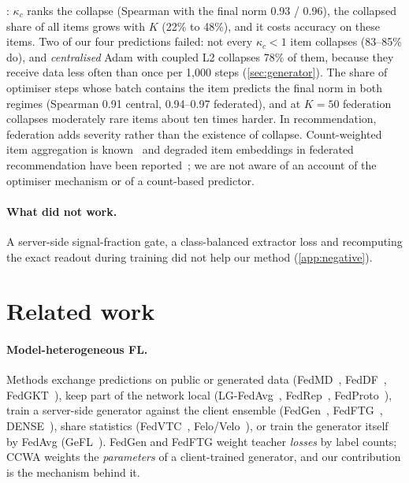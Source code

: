 \documentclass[10pt]{article}
\theoremstyle{plain}
\theoremstyle{definition}
\begin{document}
: $\kappa_c$ ranks the collapse (Spearman with the final norm 0.93 / 0.96), the collapsed share of
all items grows with $K$ (22\% to 48\%), and it costs accuracy on these items. Two of our four predictions failed: not
every $\kappa_c<1$ item collapses (83--85\% do), and \emph{centralised} Adam with coupled L2 collapses 78\% of them,
because they receive data less often than once per 1,000 steps (\cref{sec:generator}). The share of optimiser steps
whose batch contains the item predicts the final norm in both regimes (Spearman 0.91 central, 0.94--0.97 federated),
and at $K=50$ federation collapses moderately rare items about ten times harder. In recommendation, federation adds
severity rather than the existence of collapse. Count-weighted item aggregation is known~\cite{perifanis2022fedncf} and degraded item embeddings in federated
recommendation have been reported~\cite{shen2025embedding}; we are not aware of an account of the optimiser mechanism
or of a count-based predictor.

\paragraph{What did not work.} A server-side signal-fraction gate, a class-balanced extractor loss and recomputing
the exact readout during training did not help our method (\cref{app:negative}).

\section{Related work}

\paragraph{Model-heterogeneous FL.} Methods exchange predictions on public or generated data
(FedMD~\cite{li2019fedmd}, FedDF~\cite{lin2020feddf}, FedGKT~\cite{he2020fedgkt}), keep part of the network local
(LG-FedAvg~\cite{liang2019lg}, FedRep~\cite{collins2021fedrep}, FedProto~\cite{tan2022fedproto}), train a server-side
generator against the client ensemble (FedGen~\cite{zhu2021fedgen}, FedFTG~\cite{zhang2022fedftg},
DENSE~\cite{zhang2022dense}), share statistics (FedVTC~\cite{niu2026fedvtc}, Felo/Velo~\cite{chan2025}), or train the
generator itself by FedAvg (GeFL~\cite{kang2025gefl}). FedGen and FedFTG weight teacher \emph{losses} by label counts;
CCWA weights the \emph{parameters} of a client-trained generator, and our contribution is the mechanism behind it.
\end{document}

